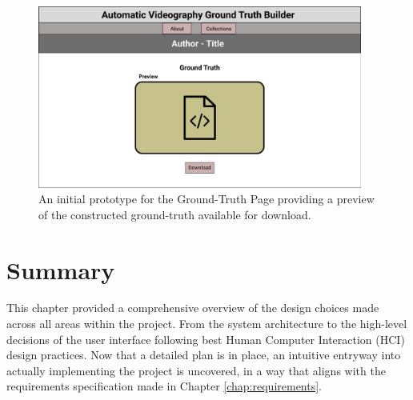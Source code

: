 \documentclass{l4proj}
\begin{document}
\begin{figure}[H]
    \centering
    \includegraphics[width=0.95\textwidth]{figures/ground_truth_page.pdf}
    \caption{An initial prototype for the Ground-Truth Page providing a preview of the constructed ground-truth available for download.}
    \label{fig:ground_truth_page}
\end{figure}


\section{Summary}
This chapter provided a comprehensive overview of the design choices made across all areas within the project. From the system architecture to the high-level decisions of the user interface following best Human Computer Interaction (HCI) design practices. Now that a detailed plan is in place, an intuitive entryway into actually implementing the project is uncovered, in a way that aligns with the requirements specification made in Chapter \ref{chap:requirements}. 



\end{document}
